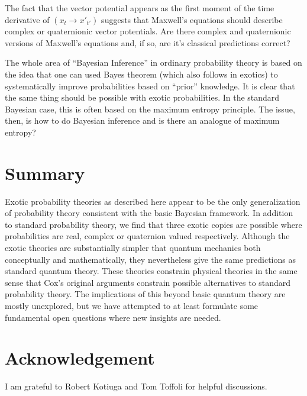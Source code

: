 \documentclass[12pt]{article}
\begin{document}
The fact that the vector potential appears as the first moment 
of the time derivative of $(x_t\rightarrow {x'}_{t'})$ suggests that Maxwell's 
equations should describe complex or quaternionic vector 
potentials.  Are there complex and quaternionic versions of Maxwell's
equations and, if so, are it's classical predictions correct?

   The whole area of ``Bayesian Inference'' in ordinary probability theory
is based on the idea that one can used Bayes theorem (which also follows in 
exotics) to systematically improve probabilities based on ``prior'' knowledge.
It is clear that the same thing should be possible with exotic probabilities.
In the standard Bayesian case, this is often based on the maximum entropy 
principle. The issue, then, is how to do Bayesian inference and is there an
analogue of maximum entropy?

\section{Summary}

    Exotic probability theories as described here appear to be the  
only generalization of probability theory consistent with the basic
Bayesian framework.  In addition to standard probability theory, we
find that three exotic copies are possible where probabilities are real, complex or
quaternion valued respectively.  Although the exotic theories are substantially simpler
that quantum mechanics both conceptually and mathematically, they nevertheless
give the same predictions as standard quantum theory.  These theories 
constrain physical theories in the same sense that
Cox's original arguments constrain possible alternatives to standard
probability theory.  The implications of this beyond basic quantum
theory are mostly unexplored, but we have attempted to at least 
formulate some fundamental open questions where new insights are needed.

\section{Acknowledgement}

I am grateful to Robert Kotiuga and Tom Toffoli for helpful discussions. 
\end{document}
